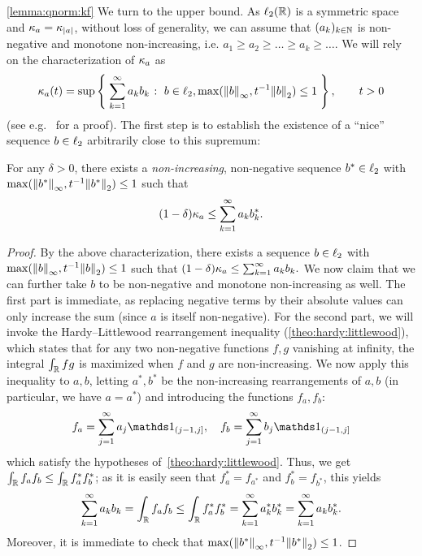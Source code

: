 \begin{proofof}{\cref{lemma:qnorm:kf}}
  We turn to the upper bound. As $\lp[2](\R)$ is a symmetric space and $\kf{a}=\kf{\abs{a}}$, without loss of generality, we can assume that $(a_k)_{k\in\N}$ is non-negative and monotone non-increasing, i.e. $a_1\geq a_2\geq\dots\geq a_k \geq \dots$. We will rely on the characterization of $\kf{a}$ as
  \[
      \kf{a}(t) = \sup\setOfSuchThat{ \sum_{k=1}^\infty a_kb_k }{ b\in\lp[2], \max( \norminf{b}, t^{-1}\normtwo{b} ) \leq 1 }, \qquad t>0
  \]
  (see e.g.~\cite[Lemma 2.2]{Astashkin:2010} for a proof). The first step is to establish the existence of a ``nice'' sequence $b\in\lp[2]$ arbitrarily close to this supremum:
  \begin{claim}\label{claim:proof:lemma:qnorm:kf:1}
  For any $\delta > 0$, there exists a \emph{non-increasing}, non-negative sequence $b^\ast\in\lp[2]$ with $\max( \norminf{b^\ast}, t^{-1}\normtwo{b^\ast} ) \leq 1$ such that
  \[
      (1-\delta)\kf{a} \leq \sum_{k=1}^\infty a_kb^\ast_k.
  \]
  \end{claim}
  \begin{proof}
  By the above characterization, there exists a sequence $b\in\lp[2]$ with $\max( \norminf{b}, t^{-1}\normtwo{b} ) \leq 1$ such that
  $
  (1-\delta)\kf{a} \leq \sum_{k=1}^\infty a_kb_k.
  $
  We now claim that we can further take $b$ to be non-negative and monotone non-increasing as well. The first part is immediate, as replacing negative terms by their absolute values can only increase the sum (since $a$ is itself non-negative). For the second part, we will invoke the Hardy--Littlewood rearrangement inequality (\cref{theo:hardy:littlewood}), which states that for any two non-negative functions $f,g$ vanishing at infinity, the integral $\int_{\R} fg$ is maximized when $f$ and $g$ are non-increasing. We now apply this inequality to $a,b$, letting $a^\ast,b^\ast$ be the non-increasing rearrangements of $a,b$ (in particular, we have $a=a^\ast$) and introducing the functions $f_a, f_b$:
  \[
      f_a = \sum_{j=1}^\infty a_j \indicSet{(j-1,j]},\quad f_b = \sum_{j=1}^\infty b_j \indicSet{(j-1,j]}
  \]
  which satisfy the hypotheses of~\cref{theo:hardy:littlewood}. Thus, we get $\int_{\R} f_a f_b \leq \int_{\R} f_a^\ast f_b^\ast$; as it is easily seen that $f_a^\ast=f_{a^\ast}$ and $f_b^\ast=f_{b^\ast}$, this yields
  \[
    \sum_{k=1}^\infty a_kb_k = \int_{\R} f_a f_b \leq \int_{\R} f_a^\ast f_b^\ast = \sum_{k=1}^\infty a^\ast_kb^\ast_k= \sum_{k=1}^\infty a_kb^\ast_k.
  \]
  Moreover, it is immediate to check that $\max( \norminf{b^\ast}, t^{-1}\normtwo{b^\ast} ) \leq 1$.
  \end{proof}
  

\end{proofof}
